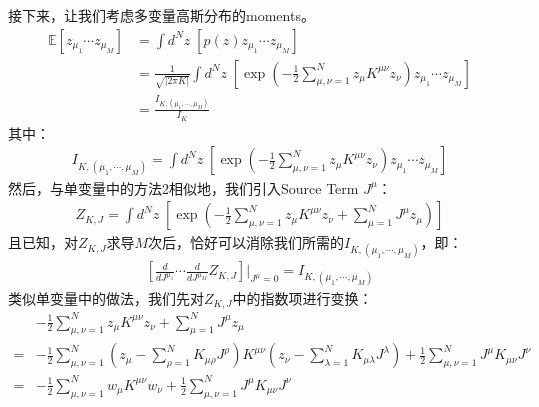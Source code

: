 接下来，让我们考虑多变量高斯分布的moments。
\begin{equation}
    \begin{split}
        \label{eq:1.36}
        \mathbb{E}[z_{\mu_1}\cdots z_{\mu_M}]
        &= \int{d^{N}\!z}\;
        [p(z)z_{\mu_1}\cdots z_{\mu_M}]\\
        &= \frac{1}{\sqrt{|2\pi K|}}
        \int{d^{N}\!z}\;
        \left[
        \exp 
        \left(
            - \frac{1}{2} \sum_{\mu,\nu=1}^N z_{\mu}K^{\mu\nu}z_{\nu}
        \right)
        z_{\mu_1}\cdots z_{\mu_M}
        \right] \\
        &= \frac{I_{K,(\mu_1,\cdots,\mu_M)}}{I_K}
    \end{split}
\end{equation}
其中：
\begin{equation}
    \begin{split}
        I_{K,(\mu_1,\cdots,\mu_M)} = \int{d^{N}\!z}\;
        \left[
        \exp 
        \left(
            - \frac{1}{2} \sum_{\mu,\nu=1}^N z_{\mu}K^{\mu\nu}z_{\nu}
        \right)
        z_{\mu_1}\cdots z_{\mu_M}
        \right] 
    \end{split}
\end{equation}
然后，与单变量中的方法2相似地，我们引入Source Term $J^{\mu}$：
\begin{equation}
    \begin{split}
    \label{eq:1.38}
        Z_{K,J} = \int{d^{N}\!z}\;
        \left[
        \exp 
        \left(
            - \frac{1}{2} \sum_{\mu,\nu=1}^N z_{\mu}K^{\mu\nu}z_{\nu} + \sum_{\mu=1}^N J^{\mu} z_{\mu}
        \right)
        \right] 
    \end{split}
\end{equation}
且已知，对$Z_{K,J}$求导$M$次后，恰好可以消除我们所需的$I_{K,(\mu_1,\cdots,\mu_M)}$，即：
\begin{equation}
    \begin{split}
    \label{eq:1.39}
        \left[\frac{d}{dJ^{\mu_1}}\cdots \frac{d}{dJ^{\mu_M}} Z_{K,J} \right] \bigg|_{J^\mu=0} = I_{K,(\mu_1,\cdots,\mu_M)}
    \end{split}
\end{equation}
类似单变量中的做法，我们先对$Z_{K,J}$中的指数项进行变换：
\begin{equation}
    \begin{split}
        & - \frac{1}{2} \sum_{\mu,\nu=1}^N z_{\mu}K^{\mu\nu}z_{\nu} + \sum_{\mu=1}^N J^{\mu} z_{\mu} \\
        = & - \frac{1}{2} \sum_{\mu,\nu=1}^N
        \left(z_\mu - \sum_{\rho=1}^N{K_{\mu\rho}J^{\rho}} \right)
        K^{\mu\nu}
        \left(z_\nu - \sum_{\lambda=1}^N{K_{\mu\lambda}J^{\lambda}} \right) + 
        \frac{1}{2} \sum_{\mu,\nu=1}^{N} J^{\mu}K_{\mu\nu}J^{\nu} \\
        = & - \frac{1}{2} \sum_{\mu,\nu=1}^N
        w_\mu
        K^{\mu\nu}
        w_\nu + 
        \frac{1}{2} \sum_{\mu,\nu=1}^{N} J^{\mu}K_{\mu\nu}J^{\nu} 
    \end{split}
\end{equation}
